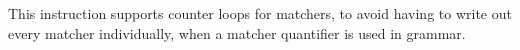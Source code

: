 This instruction supports counter loops for matchers,
to avoid having to write out every matcher individually,
when a matcher quantifier is used in grammar.
